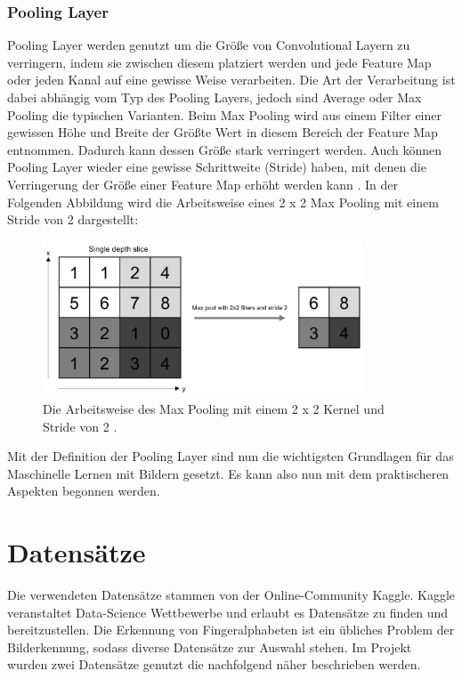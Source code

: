 \documentclass[11pt,bibliography=totocnumbered]{scrartcl}
\begin{document}
\subsubsection{Pooling Layer}
Pooling Layer werden genutzt um die Größe von Convolutional Layern zu verringern, indem sie zwischen diesem platziert werden und jede Feature Map oder jeden Kanal auf eine gewisse Weise verarbeiten. Die Art der Verarbeitung ist dabei abhängig vom Typ des Pooling Layers, jedoch sind Average oder Max Pooling die typischen Varianten. Beim Max Pooling wird aus einem Filter einer gewissen Höhe und Breite der Größte Wert in diesem Bereich der Feature Map entnommen. Dadurch kann dessen Größe stark verringert werden. Auch können Pooling Layer wieder eine gewisse Schrittweite (Stride) haben, mit denen die Verringerung der Größe einer Feature Map erhöht werden kann \cite[S.18-19]{DEEP_LEARNING_CV}\cite[S.369-370]{MACHINE_LEARNING}. In der Folgenden Abbildung wird die Arbeitsweise eines 2 x 2 Max Pooling mit einem Stride von 2 dargestellt: 
\begin{figure}[H]
	\centering
	\includegraphics[width=0.85\textwidth]{pooling}
	\vspace*{-3mm}
	\caption[Arbeitsweise des Max Pooling]{Die Arbeitsweise des Max Pooling mit einem 2 x 2 Kernel und Stride von 2 \cite[S.19]{DEEP_LEARNING_CV}.}
	\label{fig:pooling}
\end{figure}
\vspace*{-5mm}
Mit der Definition der Pooling Layer sind nun die wichtigsten Grundlagen für das Maschinelle Lernen mit Bildern gesetzt. Es kann also nun mit dem praktischeren Aspekten begonnen werden.
\section{Datensätze}
Die verwendeten Datensätze stammen von der Online-Community Kaggle. Kaggle veranstaltet Data-Science Wettbewerbe und erlaubt es Datensätze zu finden und bereitzustellen. Die Erkennung von Fingeralphabeten ist ein übliches Problem der Bilderkennung, sodass diverse Datensätze zur Auswahl stehen. Im Projekt wurden zwei Datensätze genutzt die nachfolgend näher beschrieben werden.
\end{document}
